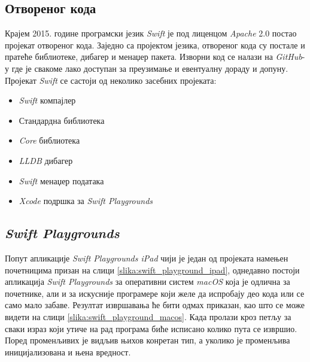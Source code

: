 \documentclass[12pt,oneside]{memoir}
\begin{document}
\subsection{Отвореног кода}
\indent Крајем 2015. године програмски језик \textit{Swift} је под лиценцом \textit{Apache} 2.0 постао пројекат отвореног кода. Заједно са пројектом језика, отвореног кода су постале и пратеће библиотеке, дибагер и менаџер пакета. Изворни код се налази на \textit{GitHub}-у где је свакоме лако доступан за преузимање и евентуалну дораду и допуну. Пројекат \textit{Swift} се састоји од неколико засебних пројеката: 
\begin{itemize}
    \item \textit{Swift} компајлер
    \item Стандардна библиотека
    \item \textit{Core} библиотека
    \item \textit{LLDB} дибагер
    \item \textit{Swift} менаџер података
    \item \textit{Xcode} подршка за \textit{Swift Playgrounds}
\end{itemize}

\subsection{\textit{Swift Playgrounds}}
\indent Попут апликације \textit{Swift Playgrounds iPad} чији је један од пројеката намењен почетницима призан на слици \ref{slika:swift_playground_ipad}, однедавно постоји апликација \textit{Swift Playgrounds} за оперативни систем \textit{macOS} која је одлична за почетнике, али и за искусније програмере који желе да испробају део кода или се само мало забаве. Резултат извршавања ће бити одмах приказан, као што се може видети на слици \ref{slika:swift_playground_macos}. Када пролази кроз петљу за сваки израз који утиче на рад програма биће исписано колико пута се извршио. Поред променљивих је видљив њихов конретан тип, а уколико је променљива иницијализована и њена вредност.
\end{document}
